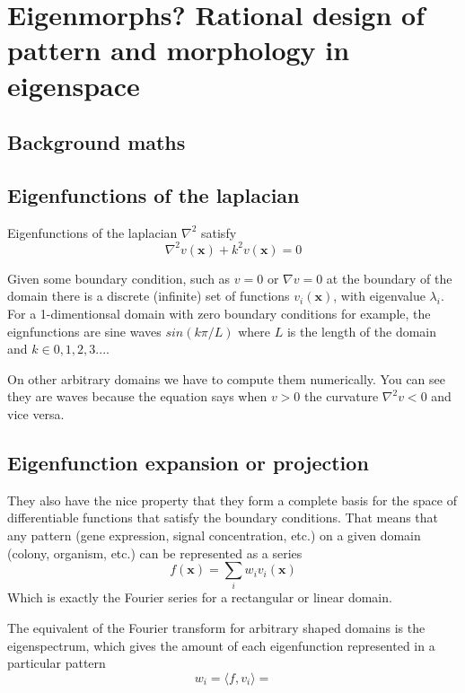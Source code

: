 \documentclass{report}
\renewcommand{\vec}[1]{\mathbf{#1}}
\begin{document}
 

\chapter{Eigenmorphs? Rational design of pattern and morphology in eigenspace}

\section{Background maths}
\section{Eigenfunctions of the laplacian}
Eigenfunctions of the laplacian $\nabla^2$ satisfy
\begin{equation}
\nabla^2 v(\vec{x}) + k^2 v(\vec{x}) = 0
\end{equation}

Given some boundary condition, such as $v=0$ or $\nabla v=0$ at the boundary of the
domain there is a discrete (infinite) set of functions $v_i(\vec{x})$, with
eigenvalue $\lambda_i$.  For a 1-dimentionsal domain with zero boundary
conditions for example, the eignfunctions are sine waves $sin(k\pi/L)$ where
$L$ is the length of the domain and $k \in {0,1,2,3...}$.

On other arbitrary domains we have to compute them numerically. You can see they
are waves because the equation says when $v>0$ the curvature $\nabla^2v<0$ and
vice versa.

\section{Eigenfunction expansion or projection}
They also have the nice property that they form a complete basis for the space
of differentiable functions that satisfy the boundary conditions. That means that
any pattern (gene expression, signal concentration, etc.) on a given domain
(colony, organism, etc.) can be represented as a series
\begin{equation}
f(\vec{x}) = \sum_{i} w_i v_i(\vec{x})
\end{equation}
Which is exactly the Fourier series for a rectangular or linear domain.

The equivalent of the Fourier transform for arbitrary shaped domains is the
eigenspectrum, which gives the amount of each eigenfunction represented in a
particular pattern
\begin{equation}
w_i = \langle f, v_i \rangle = 
\end{equation}
\end{document}
